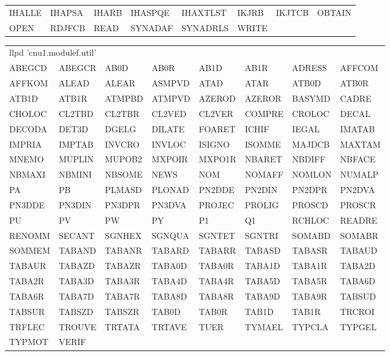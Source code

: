 
{\tiny\ttfamily
\noindent\begin{tabular}{@{}llllllll@{}}
IHALLE & IHAPSA & IHARB & IHASPQE & IHAXTLST & IKJRB & IKJTCB & OBTAIN\\
OPEN & RDJFCB & READ & SYNADAF & SYNADRLS & WRITE
\end{tabular}}

{\tiny\ttfamily
\noindent\begin{tabular}{@{}llllllll@{}}
\multicolumn{8}{l}{llpd 'cnu1.modulef.util'}\\
ABEGCD & ABEGCR & AB0D & AB0R & AB1D & AB1R & ADRESS & AFFCOM\\
AFFKOM & ALEAD & ALEAR & ASMPVD & ATAD & ATAR & ATB0D & ATB0R\\
ATB1D & ATB1R & ATMPBD & ATMPVD & AZEROD & AZEROR & BASYMD & CADRE\\
CHOLOC & CL2TBD & CL2TBR & CL2VED & CL2VER & COMPRE & CROLOC & DECAL\\
DECODA & DET3D & DGELG & DILATE & FOARET & ICHIF & IEGAL & IMATAB\\
IMPRIA & IMPTAB & INVCRO & INVLOC & ISIGNO & ISOMME & MAJDCB & MAXTAM\\
MNEMO & MUPLIN & MUPOB2 & MXPOIR & MXPO1R & NBARET & NBDIFF & NBFACE\\
NBMAXI & NBMINI & NBSOME & NEWS & NOM & NOMAFF & NOMLON & NUMALP\\
PA & PB & PLMASD & PLONAD & PN2DDE & PN2DIN & PN2DPR & PN2DVA\\
PN3DDE & PN3DIN & PN3DPR & PN3DVA & PROJEC & PROLIG & PROSCD & PROSCR\\
PU & PV & PW & PY & P1 & Q1 & RCHLOC & READRE\\
RENOMM & SECANT & SGNHEX & SGNQUA & SGNTET & SGNTRI & SOMABD & SOMABR\\
SOMMEM & TABAND & TABANR & TABARD & TABARR & TABASD & TABASR & TABAUD\\
TABAUR & TABAZD & TABAZR & TABA0D & TABA0R & TABA1D & TABA1R & TABA2D\\
TABA2R & TABA3D & TABA3R & TABA4D & TABA4R & TABA5D & TABA5R & TABA6D\\
TABA6R & TABA7D & TABA7R & TABA8D & TABA8R & TABA9D & TABA9R & TABSUD\\
TABSUR & TABSZD & TABSZR & TAB0D & TAB0R & TAB1D & TAB1R & TRCROI\\
TRFLEC & TROUVE & TRTATA & TRTAVE & TUER & TYMAEL & TYPCLA & TYPGEL\\
TYPMOT & VERIF
\end{tabular}}

